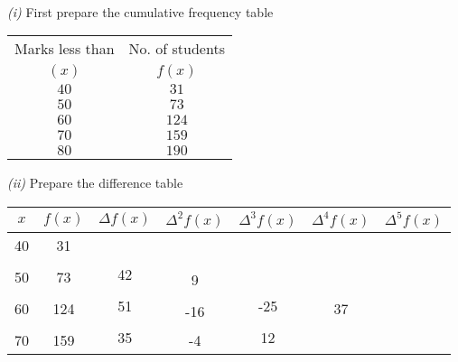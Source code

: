 \documentclass[12pt,class=book,crop=false]{standalone}
\begin{document}
\begin{soln}
    \hfill
    \\\emph{(i)} First prepare the cumulative frequency table
    \begin{center}
        \begin{tabular}{cc}
            \toprule
            Marks less than & No. of students \\
            \( (x) \)       & \( f(x) \)      \\\midrule
            \( 40 \)        & \( 31 \)        \\
            \( 50 \)        & \( 73 \)        \\
            \( 60 \)        & \( 124 \)       \\
            \( 70 \)        & \( 159 \)       \\
            \( 80 \)        & \( 190 \)       \\\bottomrule
        \end{tabular}
    \end{center}
    \emph{(ii)} Prepare the difference table
    \begin{center}
        \begin{tabular}{ccccccc}
            \toprule
            \( x \) & \( f(x) \) & \( \Delta f(x) \)   & \( \Delta^2 f(x) \)  & \( \Delta^3 f(x) \)  & \( \Delta^4 f(x) \) & \( \Delta^5 f(x) \) \\ \midrule
            40      & 31         &                     &                      &                      &                     &                     \\
                    &            & \multirow{2}{*}{42} &                      &                      &                     &                     \\
            50      & 73         &                     & \multirow{2}{*}{9}   &                      &                     &                     \\
                    &            & \multirow{2}{*}{51} &                      & \multirow{2}{*}{-25} &                     &                     \\
            60      & 124        &                     & \multirow{2}{*}{-16} &                      & 37                  &                     \\
                    &            & \multirow{2}{*}{35} &                      & \multirow{2}{*}{12}  &                     &                     \\
            70      & 159        &                     & \multirow{2}{*}{-4}  &                      &                     &                     \\

\end{tabular}
\end{center}
\end{soln}
\end{document}
